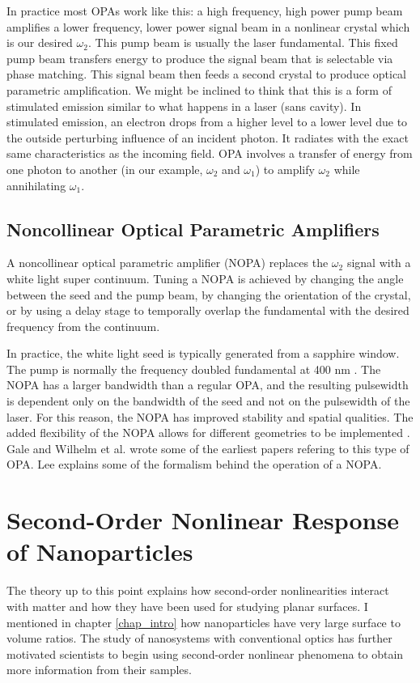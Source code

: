 \documentclass[10pt]{article}
\begin{document}
In practice most OPAs work like this: a high frequency, high power pump beam amplifies a lower frequency, lower power signal beam in a nonlinear crystal which is our desired $\omega_{2}$. This pump beam is usually the laser fundamental. This fixed pump beam transfers energy to produce the signal beam that is selectable via phase matching. This signal beam then feeds a second crystal to produce optical parametric amplification. We might be inclined to think that this is a form of stimulated emission similar to what happens in a laser (sans cavity). In stimulated emission, an electron drops from a higher level to a lower level due to the outside perturbing influence of an incident photon. It radiates with the exact same characteristics as the incoming field. OPA involves a transfer of energy from one photon to another (in our example, $\omega_{2}$ and $\omega_{1}$) to amplify $\omega_{2}$ while annihilating $\omega_{1}$.

\subsection{Noncollinear Optical Parametric Amplifiers}\label{chap_theory_nopa}
A noncollinear optical parametric amplifier (NOPA) replaces the $\omega_{2}$ signal with a white light super continuum. Tuning a NOPA is achieved by changing the angle between the seed and the pump beam, by changing the orientation of the crystal, or by using a delay stage to temporally overlap the fundamental with the desired frequency from the continuum.

In practice, the white light seed is typically generated from a sapphire window. The pump is normally the frequency doubled fundamental at 400 nm \cite{huber2001noncollinear, PhysRevB.84.165316}. The NOPA has a larger bandwidth than a regular OPA, and the resulting pulsewidth is dependent only on the bandwidth of the seed and not on the pulsewidth of the laser. For this reason, the NOPA has improved stability and spatial qualities. The added flexibility of the NOPA allows for different geometries to be implemented \cite{bodnar2010dual}. Gale \cite{gale1995sub} and Wilhelm et al. \cite{wilhelm1997sub} wrote some of the earliest papers refering to this type of OPA. Lee \cite{leecascaded} explains some of the formalism behind the operation of a NOPA.

\section{Second-Order Nonlinear Response of Nanoparticles}\label{chap_theory_nps}
The theory up to this point explains how second-order nonlinearities interact with matter and how they have been used for studying planar surfaces. I mentioned in chapter \ref{chap_intro} how nanoparticles have very large surface to volume ratios. The study of nanosystems with conventional optics has further motivated scientists to begin using second-order nonlinear phenomena to obtain more information from their samples.
\end{document}
